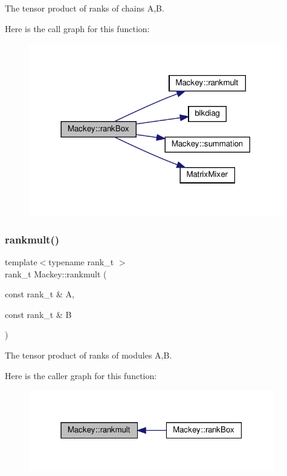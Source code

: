 The tensor product of ranks of chains A,B. 

Here is the call graph for this function\+:\nopagebreak
\begin{figure}[H]
\begin{center}
\leavevmode
\includegraphics[width=314pt]{namespaceMackey_a1257ce64369e72438023fd4e261c7c83_cgraph}
\end{center}
\end{figure}
\mbox{\label{namespaceMackey_aaa0ce7673970bf261628768fb11a1995}} 
\subsubsection{\texorpdfstring{rankmult()}{rankmult()}}
{\footnotesize\ttfamily template$<$typename rank\+\_\+t $>$ \\
rank\+\_\+t Mackey\+::rankmult (\begin{DoxyParamCaption}\item[{const rank\+\_\+t \&}]{A,  }\item[{const rank\+\_\+t \&}]{B }\end{DoxyParamCaption})}



The tensor product of ranks of modules A,B. 

Here is the caller graph for this function\+:\nopagebreak
\begin{figure}[H]
\begin{center}
\leavevmode
\includegraphics[width=304pt]{namespaceMackey_aaa0ce7673970bf261628768fb11a1995_icgraph}
\end{center}
\end{figure}
\mbox{\label{namespaceMackey_a7da73ade3ee83c4ffd614e79242d7c04}} 
